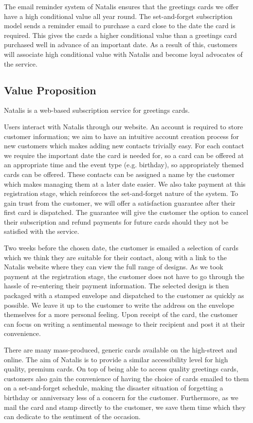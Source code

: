 \documentclass[10pt,a4paper]{article}
\begin{document}
The email reminder system of Natalis ensures that the greetings cards we offer have a high conditional value all year round. The set-and-forget subscription model sends a reminder email to purchase a card close to the date the card is required. This gives  the cards a higher conditional value than a greetings card purchased well in advance of an important date. As a result of this, customers will associate high conditional value with Natalis and become loyal advocates of the service.

\subsection*{Value Proposition}
Natalis is a web-based subscription service for greetings cards.

Users interact with Natalis through our website. An account is required to store customer information; we aim to have an intuitive account creation process for new customers which makes adding new contacts trivially easy. For each contact we require the important date the card is needed for, so a card can be offered at an appropriate time and the event type (e.g. birthday), so appropriately themed cards can be offered. These contacts can be assigned a name by the customer which makes managing them at a later date easier. We also take payment at this registration stage, which reinforces the set-and-forget nature of the system. To gain trust from the customer, we will offer a satisfaction guarantee after their first card is dispatched. The guarantee will give the customer the option to cancel their subscription and refund payments for future cards should they not be satisfied with the service.

Two weeks before the chosen date, the customer is emailed a selection of cards which we think they are suitable for their contact, along with a link to the Natalis website where they can view the full range of designs. As we took payment at the registration stage, the customer does not have to go through the hassle of re-entering their payment information. The selected design is then packaged with a stamped envelope and dispatched to the customer as quickly as possible. We leave it up to the customer to write the address on the envelope themselves for a more personal feeling. Upon receipt of the card, the customer can focus on writing a sentimental message to their recipient and post it at their convenience.

There are many mass-produced, generic cards available on the high-street and online. The aim of Natalis is to provide a similar accessibility level for high quality, premium cards. On top of being able to access quality greetings cards, customers also gain the convenience of having the choice of cards emailed to them on a set-and-forget schedule, making the disaster situation of forgetting a birthday or anniversary less of a concern for the customer. Furthermore, as we mail the card and stamp directly to the customer, we save them time which they can dedicate to the sentiment of the occasion.
\end{document}
